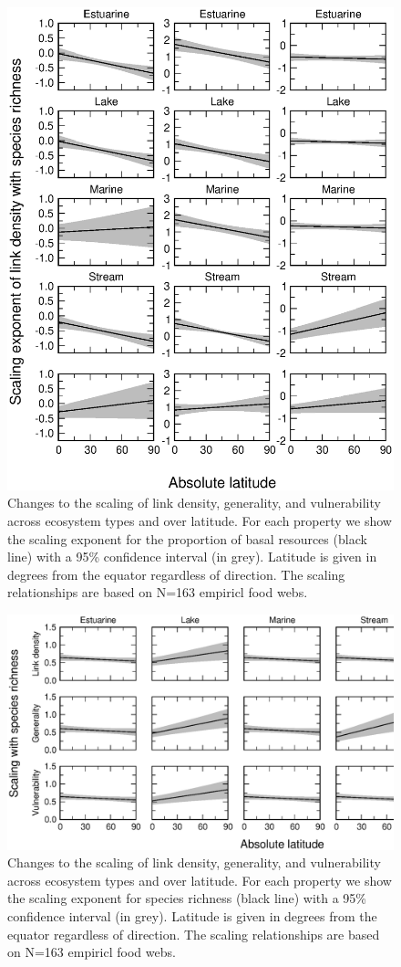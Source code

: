 \documentclass[12pt]{article}
\begin{document}
\begin{figure}[!H]
\includegraphics[width=.85\textwidth]{Figures/by_TL/marginal/BIT_marginal_latitude.eps}
\caption{Changes to the scaling of link density, generality, and vulnerability across ecosystem
types and over latitude. For each property we show the scaling exponent for the proportion of
basal resources (black line) with a 95\% confidence interval (in grey). Latitude is given in degrees
from the equator regardless of direction. The scaling relationships are based on N=163 empiricl food webs.}
\label{B}
\end{figure}



\begin{figure}[h]
\includegraphics[width=.85\textwidth]{Figures/by_TL/marginal/S_marginal_latitude_proportions.eps}
\caption{Changes to the scaling of link density, generality, and vulnerability across ecosystem
types and over latitude. For each property we show the scaling exponent for species richness (black
line) with a 95\% confidence interval (in grey). Latitude is given in degrees from the equator
regardless of direction. The scaling relationships are based on N=163 empiricl food webs.}
\label{S}
\end{figure}
\end{document}
